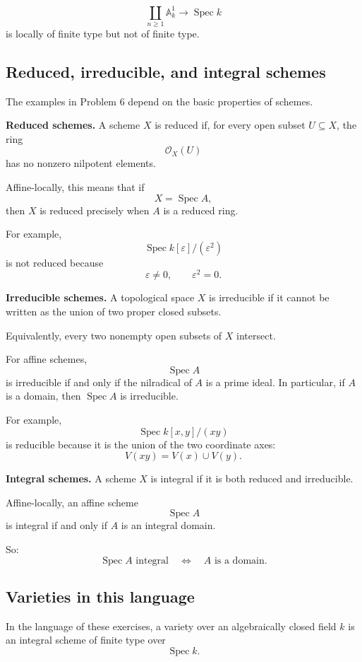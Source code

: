 \documentclass[12pt,a4paper]{article}
\DeclareMathOperator{\Spec}{Spec}
\newcommand{\OO}{\mathcal{O}}
\providecommand{\Spec}{\operatorname{Spec}}
\theoremstyle{notespace}
\begin{document}
\[
\coprod_{n\geq 1}\mathbb A_k^1\to \Spec k
\]
is locally of finite type but not of finite type.

\subsection{Reduced, irreducible, and integral schemes}

The examples in Problem 6 depend on the basic properties of schemes.

\medskip

\textbf{Reduced schemes.}
A scheme \(X\) is reduced if, for every open subset \(U\subseteq X\), the ring
\[
\OO_X(U)
\]
has no nonzero nilpotent elements.

Affine-locally, this means that if
\[
X=\Spec A,
\]
then \(X\) is reduced precisely when \(A\) is a reduced ring.

For example,
\[
\Spec k[\varepsilon]/(\varepsilon^2)
\]
is not reduced because
\[
\varepsilon\neq 0,
\qquad
\varepsilon^2=0.
\]

\medskip

\textbf{Irreducible schemes.}
A topological space \(X\) is irreducible if it cannot be written as the union of two proper closed subsets.

Equivalently, every two nonempty open subsets of \(X\) intersect.

For affine schemes,
\[
\Spec A
\]
is irreducible if and only if the nilradical of \(A\) is a prime ideal. In particular, if \(A\) is a domain, then \(\Spec A\) is irreducible.

For example,
\[
\Spec k[x,y]/(xy)
\]
is reducible because it is the union of the two coordinate axes:
\[
V(xy)=V(x)\cup V(y).
\]

\medskip

\textbf{Integral schemes.}
A scheme \(X\) is integral if it is both reduced and irreducible.

Affine-locally, an affine scheme
\[
\Spec A
\]
is integral if and only if \(A\) is an integral domain.

So:
\[
\Spec A \text{ integral}
\quad\Longleftrightarrow\quad
A \text{ is a domain}.
\]

\subsection{Varieties in this language}

In the language of these exercises, a variety over an algebraically closed field \(k\) is an integral scheme of finite type over
\[
\Spec k.
\]
\end{document}
